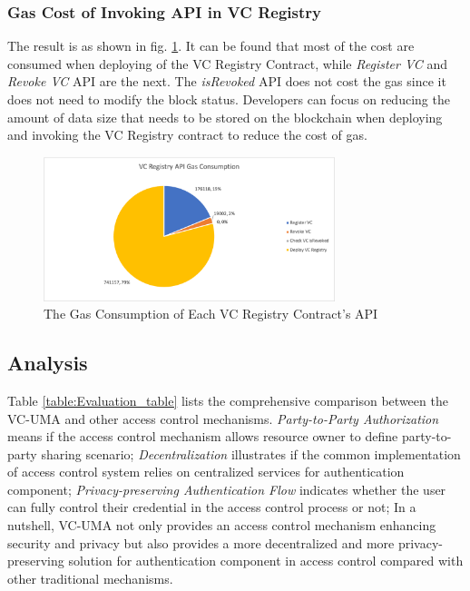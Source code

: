 \documentclass[conference, dvipdfmx]{IEEEtran} %
\begin{document}
\begin{sloppypar}
\subsubsection{Gas Cost of Invoking API in VC Registry}

The result is as shown in fig. \ref{fig:vc_gas_consumption}. It can be found that most of the cost are consumed when deploying of the VC Registry Contract, while \textit{Register VC} and \textit{Revoke VC} API are the next. The \textit{isRevoked} API does not cost the gas since it does not need to modify the block status. 
Developers can focus on reducing the amount of data size that needs to be stored on the blockchain when deploying and invoking the VC Registry contract to reduce the cost of gas.

\begin{figure}[htbp] %
  \begin{center} %
  \includegraphics[width=85mm]{images/exper_fig/vc_gas_consumption.png} %
  \caption{The Gas Consumption of Each VC Registry Contract's API} %
  \label{fig:vc_gas_consumption} %
  \end{center}
\end{figure}


\subsection{Analysis}

Table \ref{table:Evaluation_table} lists the comprehensive comparison between the VC-UMA and other access control mechanisms. \textit{Party-to-Party Authorization} means if the access control mechanism allows resource owner to define party-to-party sharing  scenario;
\textit{Decentralization} illustrates if the common implementation of access control system relies on centralized services for authentication component; \textit{Privacy-preserving Authentication Flow} indicates whether the user can fully control their credential in the access control process or not;
In a nutshell, VC-UMA not only provides an access control mechanism enhancing security and privacy but also provides a more decentralized and more privacy-preserving solution for authentication component in access control compared with other traditional mechanisms. 


\end{sloppypar}
\end{document}
